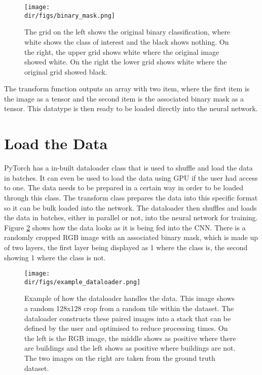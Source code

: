 \begin{figure}[htbp]
    \centering
    \texttt{[image: \\dir/figs/binary\_mask.png]}
    \caption[Binary Mask]{The grid on the left shows the original binary classification, where white shows the class of interest and the black shows nothing. On the right, the upper grid shows white where the original image showed white. On the right the lower grid shows white where the original grid showed black.}
    \label{fig.binary_mask}
\end{figure}
The transform function outputs an array with two item, where the first item is the image as a tensor and the second item is the associated binary mask as a tensor. This datatype is then ready to be loaded directly into the neural network.
\section{Load the Data}
PyTorch has a in-built dataloader class that is used to shuffle and load the data in batches. It can even be used to load the data using GPU if the user had access to one. The data needs to be prepared in a certain way in order to be loaded through this class. The transform class prepares the data into this specific format so it can be bulk loaded into the network. The dataloader then shuffles and loads the data in batches, either in parallel or not, into the neural network for training. Figure \ref{fig.dataloader} shows how the data looks as it is being fed into the CNN. There is a randomly cropped RGB image with an associated binary mask, which is made up of two layers, the first layer being displayed as 1 where the class is, the second showing 1 where the class is not. 
\begin{figure}[H]
    \centering
    \texttt{[image: \\dir/figs/example\_dataloader.png]}
    \caption[Example of how the dataloader handles the data]{Example of how the dataloader handles the data. This image shows a random 128x128 crop from a random tile within the dataset. The dataloader constructs these paired images into a stack that can be defined by the user and optimised to reduce processing times. On the left is the RGB image, the middle shows as positive where there are buildings and the left shows as positive where buildings are not. The two images on the right are taken from the ground truth dataset.}
    \label{fig.dataloader}
\end{figure}